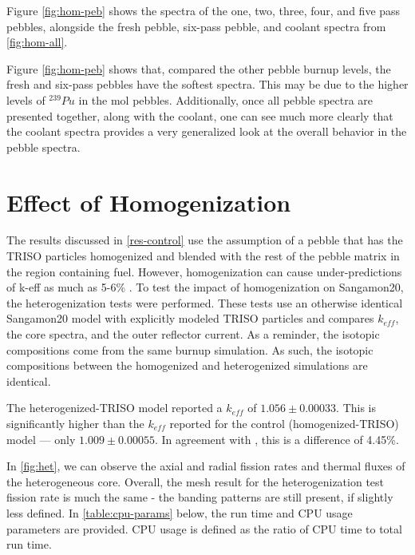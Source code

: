 Figure \ref{fig:hom-peb} shows the spectra of the one, two, three, four, and five pass pebbles, alongside the fresh pebble, six-pass pebble, and coolant spectra from \ref{fig:hom-all}. 



Figure \ref{fig:hom-peb} shows that, compared the other pebble burnup levels, the fresh and six-pass pebbles have the softest spectra.  This may be due to the higher levels of $^{239}Pu$ in the \acrshort{mol} pebbles. Additionally, once all pebble spectra are presented together, along with the coolant, one can see much more clearly that the coolant spectra provides a very generalized look at the overall behavior in the pebble spectra.


\section{Effect of Homogenization}
\label{res-hom}

The results discussed in \autoref{res-control} use the assumption of a pebble that has the TRISO particles homogenized and blended with the rest of the pebble matrix in the region containing fuel.  However, homogenization can cause under-predictions of k-eff as much as 5-6\% \cite{brown_stochastic_2005}.  To test the impact of homogenization on Sangamon20, the heterogenization tests were performed.  These tests use an otherwise identical Sangamon20 model with explicitly modeled TRISO particles and compares $k_{eff}$, the core spectra, and the outer reflector current.  As a reminder, the isotopic compositions come from the same burnup simulation.  As such, the isotopic compositions between the homogenized and heterogenized simulations are identical.




The heterogenized-TRISO model reported a $k_{eff}$ of $1.056 \pm 0.00033$.  This is significantly higher than the $k_{eff}$ reported for the control (homogenized-TRISO) model --- only $1.009 \pm 0.00055$.  In agreement with \cite{brown_stochastic_2005}, this is a difference of 4.45\%.  

In \ref{fig:het}, we can observe the axial and radial fission rates and thermal fluxes of the heterogeneous core.  Overall, the mesh result for the heterogenization test fission rate is much the same - the banding patterns are still present, if slightly less defined.  In \ref{table:cpu-params} below, the run time and CPU usage parameters are provided.  CPU usage is defined as the ratio of CPU time to total run time.

